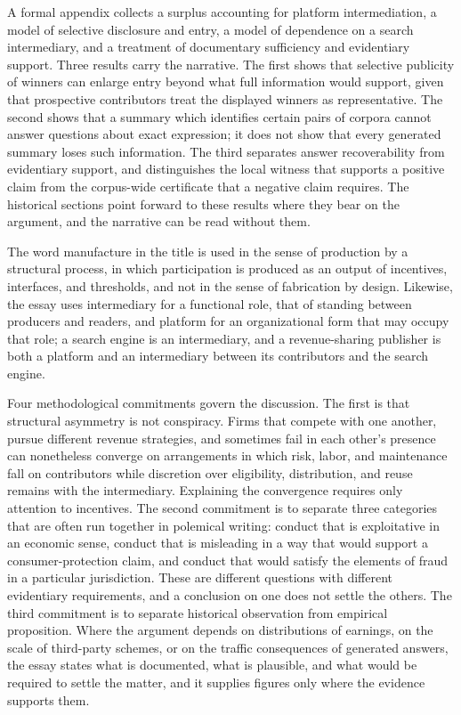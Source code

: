 \documentclass[11pt]{article}
\theoremstyle{remark}
\begin{document}
A formal appendix collects a surplus accounting for platform intermediation, a model of selective disclosure and entry, a model of dependence on a search intermediary, and a treatment of documentary sufficiency and evidentiary support. Three results carry the narrative. The first shows that selective publicity of winners can enlarge entry beyond what full information would support, given that prospective contributors treat the displayed winners as representative. The second shows that a summary which identifies certain pairs of corpora cannot answer questions about exact expression; it does not show that every generated summary loses such information. The third separates answer recoverability from evidentiary support, and distinguishes the local witness that supports a positive claim from the corpus-wide certificate that a negative claim requires. The historical sections point forward to these results where they bear on the argument, and the narrative can be read without them.

The word manufacture in the title is used in the sense of production by a structural process, in which participation is produced as an output of incentives, interfaces, and thresholds, and not in the sense of fabrication by design. Likewise, the essay uses intermediary for a functional role, that of standing between producers and readers, and platform for an organizational form that may occupy that role; a search engine is an intermediary, and a revenue-sharing publisher is both a platform and an intermediary between its contributors and the search engine.

Four methodological commitments govern the discussion. The first is that structural asymmetry is not conspiracy. Firms that compete with one another, pursue different revenue strategies, and sometimes fail in each other's presence can nonetheless converge on arrangements in which risk, labor, and maintenance fall on contributors while discretion over eligibility, distribution, and reuse remains with the intermediary. Explaining the convergence requires only attention to incentives. The second commitment is to separate three categories that are often run together in polemical writing: conduct that is exploitative in an economic sense, conduct that is misleading in a way that would support a consumer-protection claim, and conduct that would satisfy the elements of fraud in a particular jurisdiction. These are different questions with different evidentiary requirements, and a conclusion on one does not settle the others. The third commitment is to separate historical observation from empirical proposition. Where the argument depends on distributions of earnings, on the scale of third-party schemes, or on the traffic consequences of generated answers, the essay states what is documented, what is plausible, and what would be required to settle the matter, and it supplies figures only where the evidence supports them.
\end{document}
